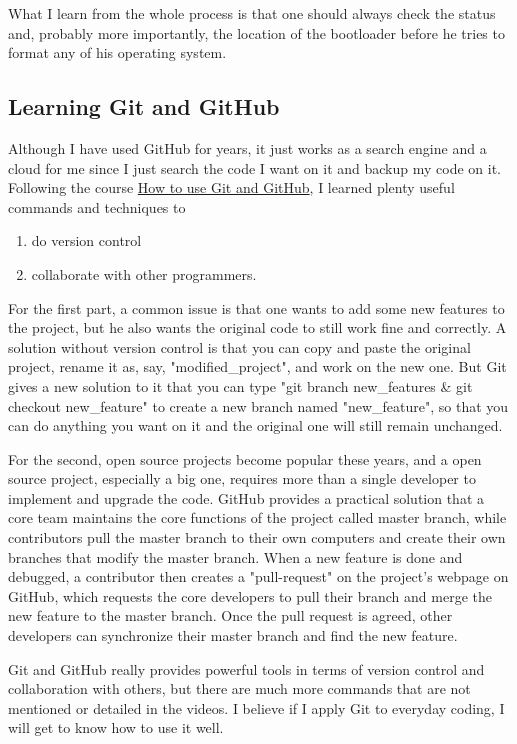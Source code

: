 \documentclass{article} %
\begin{document}
What I learn from the whole process is that one should always check the status and, probably more importantly, the location of the bootloader before he tries to format any of his operating system.

\subsection{Learning Git and GitHub}
Although I have used GitHub for years, it just works as a search engine and a cloud for me since I just search the code I want on it and backup my code on it. Following the course \href{https://www.udacity.com/course/how-to-use-git-and-github--ud775}{How to use Git and GitHub}, I learned plenty useful commands and techniques to
\begin{enumerate}
    \item do version control
    \item collaborate with other programmers.
\end{enumerate}

For the first part, a common issue is that one wants to add some new features to the project, but he also wants the original code to still work fine and correctly. A solution without version control is that you can copy and paste the original project, rename it as, say, "modified\_project", and work on the new one. But Git gives a new solution to it that you can type "git branch new\_features \& git checkout new\_feature" to create a new branch named "new\_feature", so that you can do anything you want on it and the original one will still remain unchanged.

For the second, open source projects become popular these years, and a open source project, especially a big one, requires more than a single developer to implement and upgrade the code. GitHub provides a practical solution that a core team maintains the core functions of the project called master branch, while contributors pull the master branch to their own computers and create their own branches that modify the master branch. When a new feature is done and debugged, a contributor then creates a "pull-request" on the project's webpage on GitHub, which requests the core developers to pull their branch and merge the new feature to the master branch. Once the pull request is agreed, other developers can synchronize their master branch and find the new feature.

Git and GitHub really provides powerful tools in terms of version control and collaboration with others, but there are much more commands that are not mentioned or detailed in the videos. I believe if I apply Git to everyday coding, I will get to know how to use it well.
\end{document}
